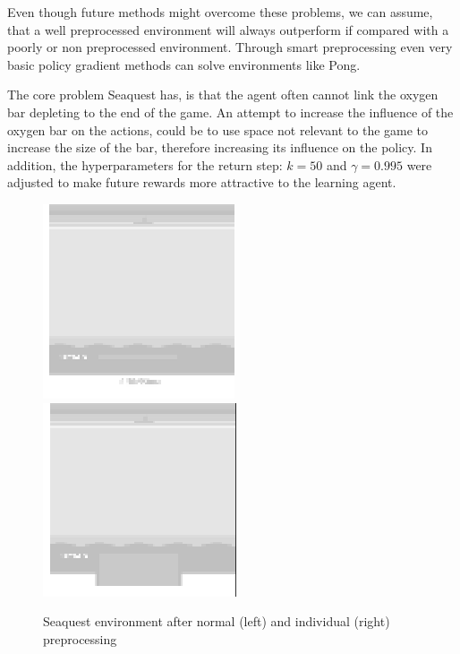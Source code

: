 Even though future methods might overcome these problems, we can assume, that a well preprocessed environment will always outperform if compared with a poorly or non preprocessed environment.
Through smart preprocessing even very basic policy gradient methods can solve environments like Pong.  \citep{karpathy}

The core problem Seaquest has, is that the agent often cannot link the oxygen bar depleting to the end of the game. 
An attempt to increase the influence of the oxygen bar on the actions, could be to use space not relevant to the game to increase the size of the bar, therefore increasing its influence on the policy.
In addition, the hyperparameters for the return step: $k=50$ and $\gamma =0.995$ were adjusted to make future rewards more attractive to the learning agent.

\begin{figure}[h]
\includegraphics[scale=1]{bilder/seaquestgamenopre.png}
\includegraphics[scale=1]{bilder/seaquestgameprepro.png}
\caption{Seaquest environment after normal (left) and individual (right) preprocessing}
\end{figure}

